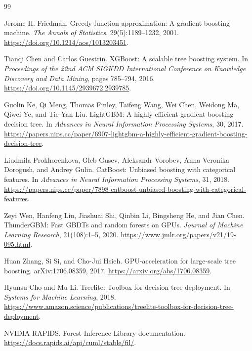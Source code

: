 \documentclass[11pt]{article}
\begin{document}
\begin{thebibliography}{99}
\raggedright

Jerome H. Friedman.
\newblock Greedy function approximation: A gradient boosting machine.
\newblock \emph{The Annals of Statistics}, 29(5):1189--1232, 2001.
\newblock \url{https://doi.org/10.1214/aos/1013203451}.

Tianqi Chen and Carlos Guestrin.
\newblock XGBoost: A scalable tree boosting system.
\newblock In \emph{Proceedings of the 22nd ACM SIGKDD International Conference
on Knowledge Discovery and Data Mining}, pages 785--794, 2016.
\newblock \url{https://doi.org/10.1145/2939672.2939785}.

Guolin Ke, Qi Meng, Thomas Finley, Taifeng Wang, Wei Chen, Weidong Ma, Qiwei Ye,
and Tie-Yan Liu.
\newblock LightGBM: A highly efficient gradient boosting decision tree.
\newblock In \emph{Advances in Neural Information Processing Systems}, 30,
2017.
\newblock \url{https://papers.nips.cc/paper/6907-lightgbm-a-highly-efficient-gradient-boosting-decision-tree}.

Liudmila Prokhorenkova, Gleb Gusev, Aleksandr Vorobev, Anna Veronika Dorogush,
and Andrey Gulin.
\newblock CatBoost: Unbiased boosting with categorical features.
\newblock In \emph{Advances in Neural Information Processing Systems}, 31,
2018.
\newblock \url{https://papers.nips.cc/paper/7898-catboost-unbiased-boosting-with-categorical-features}.

Zeyi Wen, Hanfeng Liu, Jiashuai Shi, Qinbin Li, Bingsheng He, and Jian Chen.
\newblock ThunderGBM: Fast GBDTs and random forests on GPUs.
\newblock \emph{Journal of Machine Learning Research}, 21(108):1--5, 2020.
\newblock \url{https://www.jmlr.org/papers/v21/19-095.html}.

Huan Zhang, Si Si, and Cho-Jui Hsieh.
\newblock GPU-acceleration for large-scale tree boosting.
\newblock arXiv:1706.08359, 2017.
\newblock \url{https://arxiv.org/abs/1706.08359}.

Hyunsu Cho and Mu Li.
\newblock Treelite: Toolbox for decision tree deployment.
\newblock In \emph{Systems for Machine Learning}, 2018.
\newblock \url{https://www.amazon.science/publications/treelite-toolbox-for-decision-tree-deployment}.

NVIDIA RAPIDS.
\newblock Forest Inference Library documentation.
\newblock \url{https://docs.rapids.ai/api/cuml/stable/fil/}.


\end{thebibliography}
\end{document}
